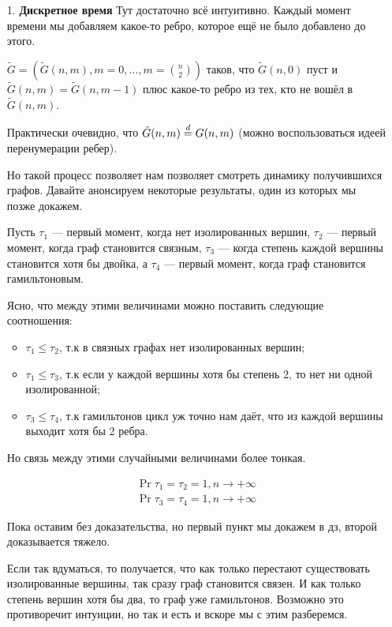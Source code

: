 \begin{itemize}
  \item[1.] \textbf{Дискретное время}
  Тут достаточно всё интуитивно. Каждый момент времени мы добавляем какое-то
  ребро, которое ещё не было добавлено до этого.
  \begin{definition}
    $\tilde{G} = (\tilde{G}(n, m), m = 0, \ldots,
    m = \binom{n}{2})$ таков, что $\tilde{G}(n, 0)$ пуст и 
    $\tilde{G}(n, m) = \tilde{G}(n, m - 1)$ плюс какое-то ребро из тех, кто не вошёл
    в $\tilde{G}(n, m)$.
  \end{definition}

  Практически очевидно, что $\tilde{G}(n, m) \overset{d}{=} G(n, m)$ (можно воспользоваться
  идеей перенумерации ребер).

  Но такой процесс позволяет нам позволяет смотреть динамику получившихся графов.
  Давайте анонсируем некоторые результаты, один из которых мы позже докажем.

  Пусть $\tau_1$ --- первый момент, когда нет изолированных вершин, $\tau_2$ ---
  первый момент, когда граф становится связным, $\tau_3$ --- когда степень каждой
  вершины
  становится хотя бы двойка, а $\tau_4$ --- первый момент, когда граф становится
  гамильтоновым.

  Ясно, что между этими величинами можно поставить следующие соотношения:
  \begin{itemize}
    \item $\tau_1 \leq \tau_2$, т.к в связных графах нет изолированных вершин;
    \item $\tau_1 \leq \tau_3$, т.к если у каждой вершины хотя бы степень 2, то нет ни одной изолированной;
    \item $\tau_3 \leq \tau_4$, т.к гамильтонов цикл уж точно нам даёт, что из 
    каждой вершины выходит хотя бы 2 ребра.
  \end{itemize}
  Но связь между этими случайными величинами более тонкая.
  \begin{theorem}
    \begin{align}
      \Pr{\tau_1 = \tau_2} = 1, n \to +\infty\\
      \Pr{\tau_3 = \tau_4} = 1, n \to +\infty
    \end{align}
  \end{theorem}

  Пока оставим без доказательства, но первый пункт мы докажем в дз, второй
  доказывается тяжело.

  Если так вдуматься, то получается, что как только перестают существовать изолированные
  вершины, так сразу граф становится связен. И как только степень вершин хотя бы
  два, то граф уже гамильтонов. Возможно это противоречит интуиции, но так и есть и 
  вскоре мы с этим разберемся.


\end{itemize}
